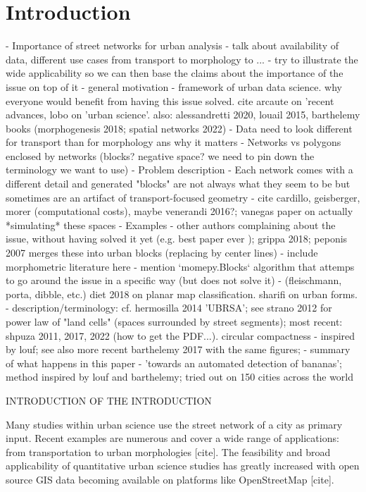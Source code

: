 \section{Introduction}
\label{sec:intro}

- Importance of street networks for urban analysis
    - talk about availability of data, different use cases from transport to morphology
    to ...
    - try to illustrate the wide applicability so we can then base the claims about the
    importance of the issue on top of it
    - general motivation - framework of urban data science. why everyone would
    benefit from having this issue solved. cite arcaute on 'recent advances, lobo on 'urban
    science'. also: alessandretti 2020, louail 2015, barthelemy books (morphogenesis 2018;
    spatial networks 2022)
- Data need to look different for transport than for morphology ans why it matters
    - Networks vs polygons enclosed by networks (blocks? negative space? we need to pin down the
    terminology we want to use)
- Problem description
    - Each network comes with a different detail and generated "blocks" are not always
    what they seem to be but sometimes are an artifact of transport-focused geometry
    - cite cardillo, geisberger, morer (computational costs), maybe venerandi 2016?;
    vanegas paper on actually *simulating* these spaces
- Examples - other authors complaining about the issue, without having solved
it yet (e.g. best paper ever \cite{vybornova2022automated}); grippa 2018; peponis 2007
merges these into urban blocks (replacing by center lines)
    - include morphometric literature here - mention `momepy.Blocks` algorithm that
    attemps to go around the issue in a specific way (but does not solve it)
        - (fleischmann, porta, dibble, etc.) diet 2018 on planar map
        classification. sharifi on urban forms.
    - description/terminology: cf. hermosilla 2014 'UBRSA'; see strano 2012 for power
    law of "land cells" (spaces surrounded by street segments); most recent: shpuza 2011,
    2017, 2022 (how to get the PDF...). circular compactness - inspired by louf; see also
    more recent barthelemy 2017 with the same figures;
-  summary of what happens in this paper
    - 'towards an automated detection of
    bananas'; method inspired by louf and barthelemy; tried out on 150 cities across the
    world


\bigskip

INTRODUCTION OF THE INTRODUCTION

Many studies within urban science use the street network of a city as primary input. Recent examples are numerous and cover a wide range of applications: from transportation to urban morphologies [cite]. The feasibility and broad applicability of quantitative urban science studies has greatly increased with open source GIS data becoming available on platforms like OpenStreetMap [cite]. 

